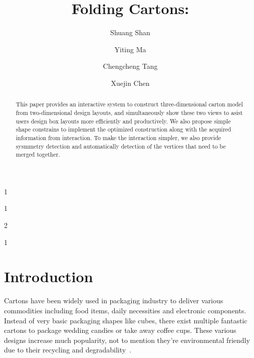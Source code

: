 \documentclass[submission]{gmp2018}
\begin{document}
%
%
\title{Folding Cartons: }

%
%

%
%
\author{Shuang Shan}{1}
\author{Yiting Ma}{1}
\author{Chengcheng Tang}{2}
\author{Xuejin Chen}{1}

%
%

%
%


\maketitle

\begin{abstract}
This paper provides an interactive system to construct three-dimensional carton model from two-dimensional design layouts, and simultaneously show these two views to asist users design box layouts more efficiently and productively. We also propose simple shape constrains to implement the optimized construction along with the acquired information from interaction. To make the interaction simpler, we also provide sysmmetry detection and automatically detection of the vertices that need to be merged together.  
\end{abstract}


\section{Introduction}
Cartons have been widely used in packaging industry to deliver various commodities including food items, daily necessities and electronic components. Instead of very basic packaging shapes like cubes, there exist multiple fantastic cartons to package wedding candies or take away coffee cups. These various designs increase much popularity, not to mention they're environmental friendly due to their recycling and degradability~\cite{Mullineux:2010:CSC:1739328.1739673}.
\end{document}

